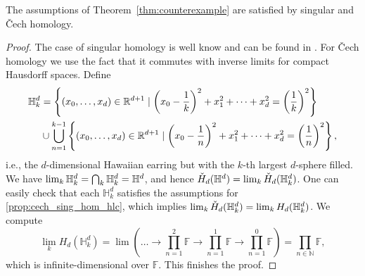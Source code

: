 \begin{prop}
	The assumptions of Theorem~\ref{thm:counterexample} are satisfied by singular and \v{Cech} homology.
\end{prop}

\begin{proof}
	The case of singular homology is well know and can be found in \cite{Barratt.1962}.
	For \v{C}ech homology we use the fact that it commutes with inverse limits for compact Hausdorff spaces.
	Define 
	\begin{align*}
	\mathbb{H}^d_k &= \left\{(x_0,\dots,x_d)\in\mathbb{R}^{d+1}\mid \left(x_0-\frac{1}{k}\right)^2+x_1^2+\dots+x_d^2=\left(\frac{1}{k}\right)^2\right\}\\
	&\cup\bigcup_{n=1}^{k-1}\left\{(x_0,\dots,x_d)\in\mathbb{R}^{d+1}\mid \left(x_0-\frac{1}{n}\right)^2+x_1^2+\dots+x_d^2=\left(\frac{1}{n}\right)^2\right\},
	\end{align*}
	i.e., the $d$-dimensional Hawaiian earring but with the $k$-th largest $d$-sphere filled.
	We have $\lim_{k}\mathbb{H}^d_{k} = \bigcap_{k}\mathbb{H}^{d}_{k}=\mathbb{H}^{d}$, and hence $\check{H}_{d}(\mathbb{H}^d) = \lim_{k}\check{H}_{d}(\mathbb{H}^{d}_{k})$.
	One can easily check that each $\mathbb{H}^{d}_{k}$ satisfies the assumptions for \cref{prop:cech_sing_hom_hlc}, which implies $\lim_{k}\check{H}_{d}(\mathbb{H}^{d}_{k})=\lim_{k}H_{d}(\mathbb{H}^{d}_{k})$.
	We compute
	\begin{equation*}
	\lim_{k}H_{d}(\mathbb{H}^{d}_{k})=\lim\left(\dots\to \prod_{n=1}^2\mathbb{F}\to \prod_{n=1}^1\mathbb{F}\to \prod_{n=1}^0\mathbb{F}\right)=\prod_{n\in\mathbb{N}}\mathbb{F},
	\end{equation*}
	which is infinite-dimensional over $\mathbb{F}$.
	This finishes the proof.
\end{proof}